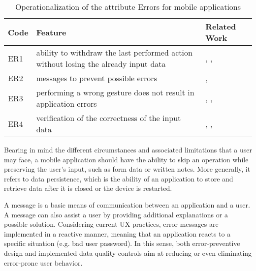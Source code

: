 \documentclass[preprint,12pt]{elsarticle}
\begin{document}
\begin{table}[h]
\caption{Operationalization of the attribute Errors for mobile applications}
\label{tab:oper-errors}
\footnotesize
\begin{tabular}{|l|p{9cm}|p{2.5cm}|}
\hline
\textbf{Code}  & \textbf{Feature}   & \textbf{Related Work} \\ \hline
ER1 & ability to withdraw  the last performed action without losing the already input data &
\cite{franke2012mobile}, \cite{alvarado2018layered}, \cite{nunez2020model}       \\ \hline
ER2 & messages to prevent possible errors  &  \cite{inostroza2012usability}, \cite{kuparinen2013introducing} \\ \hline
ER3 & performing a wrong gesture does not result in application errors  & \cite{heuwing2015usability}, \cite{pushp2018privacyshield}, \cite{wu2020user}       \\ \hline
ER4 & verification of the correctness of the input data & \cite{schneider2008investigation}, \cite{qin2011usability}, \cite{george2018usability}  \\ \hline
\end{tabular}
\end{table}

Bearing in mind the different circumstances and associated limitations that a user may face, a mobile application should have the ability to skip an operation while preserving the user's input, such as form data or written notes. More generally, it refers to data persistence, which is the ability of an application to store and retrieve data after it is closed or the device is restarted. 

A message is a basic means of communication between an application and a user. A message can also assist a user by providing additional explanations or a possible solution. Considering current UX practices, error messages are implemented in a reactive manner, meaning that an application reacts to a specific situation (e.g. bad user password). In this sense, both error-preventive design and implemented data quality controls aim at reducing or even eliminating error-prone user behavior.

\end{document}
